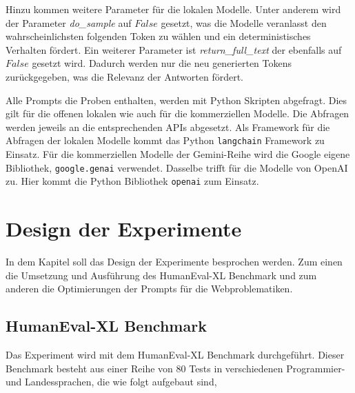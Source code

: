 Hinzu kommen weitere Parameter für die lokalen Modelle. Unter anderem wird der Parameter \textit{do\_sample} auf $False$ gesetzt, was die Modelle veranlasst den wahrscheinlichsten folgenden Token zu wählen und ein deterministisches Verhalten fördert. Ein weiterer Parameter ist \textit{return\_full\_text} der ebenfalls auf $False$ gesetzt wird. Dadurch werden nur die neu generierten Tokens zurückgegeben, was die Relevanz der Antworten fördert.\vspace{0.2cm}

Alle Prompts die Proben enthalten, werden mit Python Skripten abgefragt. Dies gilt für die offenen lokalen wie auch für die kommerziellen Modelle. Die Abfragen werden jeweils an die entsprechenden APIs abgesetzt. Als Framework für die Abfragen der lokalen Modelle kommt das Python \texttt{langchain} Framework zu Einsatz. Für die kommerziellen Modelle der Gemini-Reihe wird die Google eigene Bibliothek, \texttt{google.genai} verwendet. Dasselbe trifft für die Modelle von OpenAI zu. Hier kommt die Python Bibliothek \texttt{openai} zum Einsatz.



\section{Design der Experimente}
In dem Kapitel soll das Design der Experimente besprochen werden. Zum einen die Umsetzung und Ausführung des HumanEval-XL Benchmark und zum anderen die Optimierungen der Prompts für die Webproblematiken.

\subsection{HumanEval-XL Benchmark}
Das Experiment wird mit dem HumanEval-XL Benchmark durchgeführt. Dieser Benchmark besteht aus einer Reihe von 80 Tests in verschiedenen Programmier- und Landessprachen, die wie folgt aufgebaut sind,

